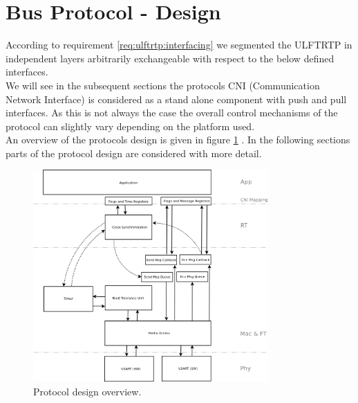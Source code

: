 \section{Bus Protocol - Design}
\label{sec:bus:design}

According to requirement \ref{req:ulftrtp:interfacing} we segmented the ULFTRTP in 
independent layers arbitrarily exchangeable with respect to the below defined interfaces.\\

We will see in the subsequent sections the protocols CNI (Communication Network Interface) 
is considered as a stand alone component with push and pull interfaces.
As this is not always the case the overall control mechanisms of the 
protocol can slightly vary depending on the platform used.\\

An overview of the protocols design is given in figure 
\ref{fig:bus:design:overview} . 
In the following sections parts of the protocol design are considered with more detail.

\begin{figure}[h]
\centering
\includegraphics[width=0.8\textwidth]{../images/protocol_design_overview.png}
\caption{Protocol design overview.}
\label{fig:bus:design:overview}
\end{figure}





